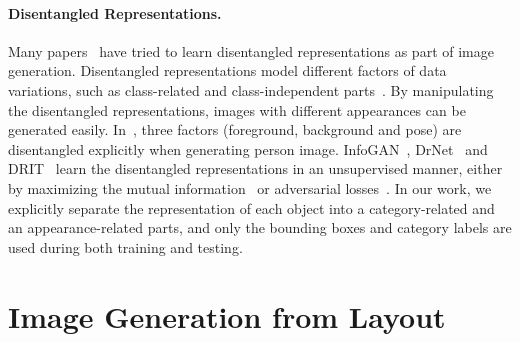 \documentclass[10pt,twocolumn,letterpaper]{article}
\begin{document}
\vspace{-0.15in}
\paragraph{Disentangled Representations.}
Many papers~\cite{chen2016infogan,Cheung2015,Denton2017,Lai2017,lee2018diverse,Ma2018,Mathieu2016,Murez2018} have tried to learn disentangled representations as part of image generation. Disentangled representations model different factors of data variations, such as class-related and class-independent parts~\cite{Cheung2015,Lai2017,lee2018diverse,Mathieu2016,Murez2018}. By manipulating the disentangled representations, images with different appearances can be generated easily.
In~\cite{Ma2018}, three factors (foreground, background and pose) are disentangled explicitly when generating person image. 
InfoGAN~\cite{chen2016infogan}, DrNet~\cite{Denton2017} and DRIT~\cite{lee2018diverse} learn the disentangled representations in an unsupervised manner, either by maximizing the mutual information~\cite{chen2016infogan} 
or adversarial losses~\cite{Denton2017, lee2018diverse}. 
In our work, we explicitly separate the representation of each object into a category-related and an appearance-related parts, and only the bounding boxes and category labels are used during both training and testing.



\section{Image Generation from Layout}
\label{sec:method}
\end{document}
